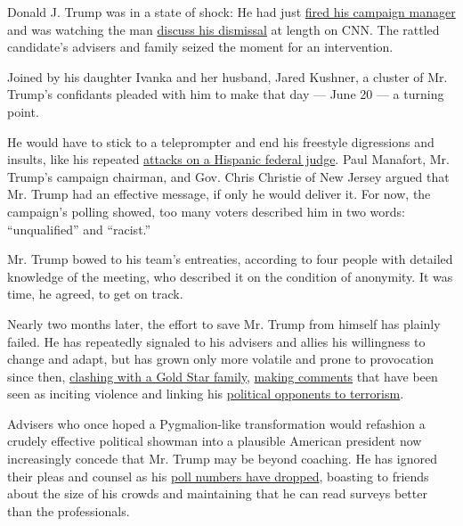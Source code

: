 Donald J. Trump was in a state of shock: He had just
\href{http://www.nytimes3xbfgragh.onion/2016/06/21/us/politics/corey\%2Dlewandowski\%2Ddonald\%2Dtrump.html?_r=0}{fired
his campaign manager} and was watching the man
\href{http://www.cnn.com/videos/politics/2016/06/20/corey-lewandowski-full-intv-trump-campaign-manager-fired-bash-wolf.cnn}{discuss
his dismissal} at length on CNN. The rattled candidate's advisers and
family seized the moment for an intervention.

Joined by his daughter Ivanka and her husband, Jared Kushner, a cluster
of Mr. Trump's confidants pleaded with him to make that day --- June 20
--- a turning point.

He would have to stick to a teleprompter and end his freestyle
digressions and insults, like his repeated
\href{http://www.nytimes3xbfgragh.onion/2016/06/08/us/politics/paul\%2Dryan\%2Ddonald\%2Dtrump\%2Dgonzalo\%2Dcuriel.html}{attacks
on a Hispanic federal judge}. Paul Manafort, Mr. Trump's campaign
chairman, and Gov. Chris Christie of New Jersey argued that Mr. Trump
had an effective message, if only he would deliver it. For now, the
campaign's polling showed, too many voters described him in two words:
``unqualified'' and ``racist.''

Mr. Trump bowed to his team's entreaties, according to four people with
detailed knowledge of the meeting, who described it on the condition of
anonymity. It was time, he agreed, to get on track.

Nearly two months later, the effort to save Mr. Trump from himself has
plainly failed. He has repeatedly signaled to his advisers and allies
his willingness to change and adapt, but has grown only more volatile
and prone to provocation since then,
\href{http://www.nytimes3xbfgragh.onion/2016/08/01/us/politics/khizr\%2Dkhan\%2Dghazala\%2Ddonald\%2Dtrump\%2Dmuslim\%2Dsoldier.html}{clashing
with a Gold Star family},
\href{http://www.nytimes3xbfgragh.onion/2016/08/10/us/politics/donald-trump-hillary-clinton.html?action=click\&contentCollection=Politics\&module=RelatedCoverage\&region=Marginalia\&pgtype=article}{making
comments} that have been seen as inciting violence and linking his
\href{http://www.nytimes3xbfgragh.onion/2016/08/11/us/politics/trump-rally.html}{political
opponents to terrorism}.

Advisers who once hoped a Pygmalion-like transformation would refashion
a crudely effective political showman into a plausible American
president now increasingly concede that Mr. Trump may be beyond
coaching. He has ignored their pleas and counsel as his
\href{http://www.nytimes3xbfgragh.onion/2016/08/12/us/politics/donald-trump-obama-isis.html}{poll
numbers have dropped}, boasting to friends about the size of his crowds
and maintaining that he can read surveys better than the professionals.

